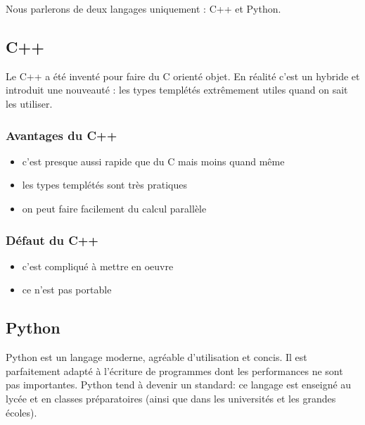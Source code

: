 Nous parlerons de deux langages uniquement : C++ et Python. 

\subsection{C++}

Le C++ a été inventé pour faire du C orienté objet. En réalité c'est un hybride et introduit une
nouveauté : les types templétés extrêmement utiles quand on sait les utiliser.


\subsubsection*{Avantages du C++}

\begin{itemize}
\item c'est presque aussi rapide que du C mais moins quand même
\item les types templétés sont tr\`es pratiques 
\item on peut faire facilement du calcul parallèle %
\end{itemize}

\subsubsection*{Défaut du C++}

\begin{itemize}
\item c'est compliqué à mettre en oeuvre
\item ce n'est pas portable %
\end{itemize}

\subsection{Python}

Python est un langage moderne, agréable d'utilisation et concis.
Il est parfaitement adapté à l'écriture de programmes dont les performances ne sont
pas importantes. Python tend à devenir un standard: ce langage est enseigné au lycée 
et en classes préparatoires (ainsi que dans les universités et les grandes \'ecoles). 

